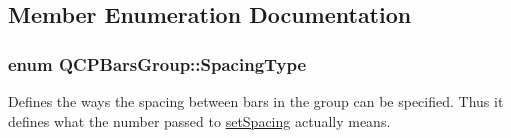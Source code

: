 \subsection{Member Enumeration Documentation}
\subsubsection[{\texorpdfstring{Spacing\+Type}{SpacingType}}]{\setlength{\rightskip}{0pt plus 5cm}enum {\bf Q\+C\+P\+Bars\+Group\+::\+Spacing\+Type}}\hypertarget{class_q_c_p_bars_group_a4c0521120a97e60bbca37677a37075b6}{}\label{class_q_c_p_bars_group_a4c0521120a97e60bbca37677a37075b6}
Defines the ways the spacing between bars in the group can be specified. Thus it defines what the number passed to \hyperlink{class_q_c_p_bars_group_aa553d327479d72a0c3dafcc724a190e2}{set\+Spacing} actually means.


